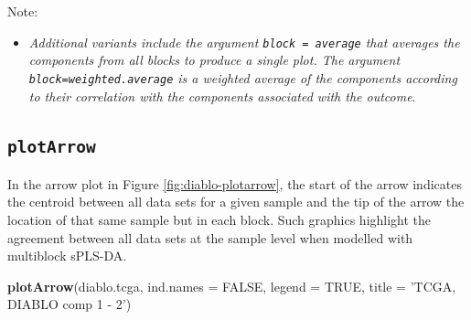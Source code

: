 \documentclass[]{book}
\newenvironment{Shaded}{\begin{snugshade}}{\end{snugshade}}
\newcommand{\KeywordTok}[1]{\textcolor[rgb]{0.13,0.29,0.53}{\textbf{#1}}}
\newcommand{\DataTypeTok}[1]{\textcolor[rgb]{0.13,0.29,0.53}{#1}}
\newcommand{\StringTok}[1]{\textcolor[rgb]{0.31,0.60,0.02}{#1}}
\newcommand{\OtherTok}[1]{\textcolor[rgb]{0.56,0.35,0.01}{#1}}
\newcommand{\NormalTok}[1]{#1}
\providecommand{\tightlist}{%
  \setlength{\itemsep}{0pt}\setlength{\parskip}{0pt}}
\begin{document}
Note:

\begin{itemize}
\tightlist
\item
  \emph{Additional variants include the argument
  \texttt{block\ =\ \textquotesingle{}average\textquotesingle{}} that
  averages the components from all blocks to produce a single plot. The
  argument
  \texttt{block=\textquotesingle{}weighted.average\textquotesingle{}} is
  a weighted average of the components according to their correlation
  with the components associated with the outcome}.
\end{itemize}

\subsection{\texorpdfstring{\texttt{plotArrow}}{plotArrow}}\label{plotarrow}

In the arrow plot in Figure \ref{fig:diablo-plotarrow}, the start of the
arrow indicates the centroid between all data sets for a given sample
and the tip of the arrow the location of that same sample but in each
block. Such graphics highlight the agreement between all data sets at
the sample level when modelled with multiblock sPLS-DA.

\begin{Shaded}
\begin{Highlighting}[]
\KeywordTok{plotArrow}\NormalTok{(diablo.tcga, }\DataTypeTok{ind.names =} \OtherTok{FALSE}\NormalTok{, }\DataTypeTok{legend =} \OtherTok{TRUE}\NormalTok{, }
          \DataTypeTok{title =} \StringTok{'TCGA, DIABLO comp 1 - 2'}\NormalTok{)}
\end{Highlighting}
\end{Shaded}
\end{document}
